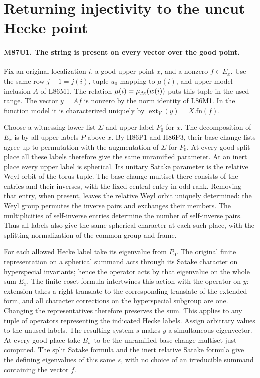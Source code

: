 \section{Returning injectivity to the uncut Hecke point}

\paragraph{M87U1. The string is present on every vector over the good point.}
Fix an original localization $i$, a good upper point $x$, and a nonzero
$f\in E_x$. Use the same row $j+1=j(i)$, tuple $u_0$ mapping to
$\mu(i)$, and upper-model inclusion $A$ of L86M1. The relation
$\mu(i)=\mu_{\rm At}(w(i))$ puts this tuple in the used range.
The vector $y=Af$ is nonzero by the norm identity of L86M1.
In the function model it is characterized uniquely by
$\operatorname{ext}_V(y)=X.\mathrm{fn}(f)$.

Choose a witnessing lower list $\Sigma$ and upper label $P_0$ for $x$.
The decomposition of $E_x$ is by all upper labels $P$ above $x$.
By H86P1 and H86P3, their base-change lists agree up to permutation
with the augmentation of $\Sigma$ for $P_0$. At every good split
place all these labels therefore give the same unramified parameter.
At an inert place every upper label is spherical. Its unitary
Satake parameter is the relative Weyl orbit of the torus tuple.
The base-change multiset there consists of the entries and their
inverses, with the fixed central entry in odd rank. Removing that
entry, when present, leaves the relative Weyl orbit uniquely
determined: the Weyl group permutes the inverse pairs and exchanges
their members. The multiplicities of self-inverse entries determine
the number of self-inverse pairs. Thus all labels also give the
same spherical character at each such place, with the splitting
normalization of the common group and frame.

For each allowed Hecke label take its eigenvalue from $P_0$.
The original finite representation on a spherical summand acts
through its Satake character on hyperspecial invariants; hence the
operator acts by that eigenvalue on the whole sum $E_x$.
The finite coset formula intertwines this action with the operator
on $y$: extension takes a right translate to the corresponding
translate of the extended form, and all character corrections
on the hyperspecial subgroup are one. Changing the representatives
therefore preserves the sum. This applies to any tuple of operators
representing the indicated Hecke labels. Assign arbitrary values
to the unused labels. The resulting system $s$ makes $y$ a
simultaneous eigenvector. At every good place take $B_w$ to be
the unramified base-change multiset just computed. The split
Satake formula and the inert relative Satake formula give the
defining eigenvalues of this same $s$, with no choice of an
irreducible summand containing the vector $f$.

